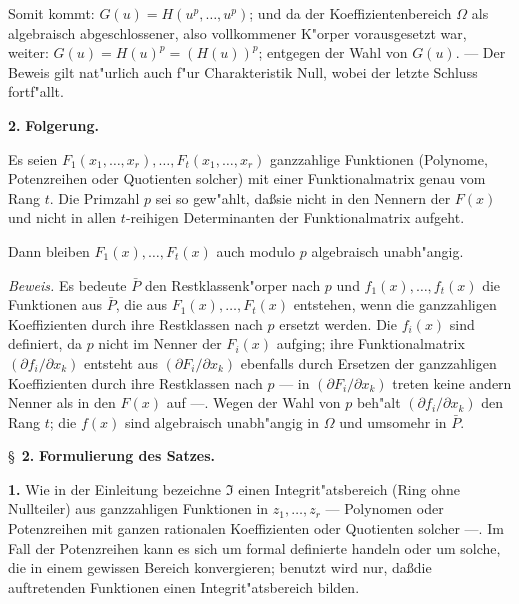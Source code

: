 \documentclass[12pt,a4paper]{article}
\theoremstyle{plain}
\begin{document}
Somit kommt: $G(u) = H(u^p,\ldots,u^p)$; und da der Koeffizientenbereich $\Omega$ als algebraisch abgeschlossener, also vollkommener K"orper vorausgesetzt war, weiter: $G(u) = H(u)^p = (H(u))^p$; entgegen der Wahl von $G(u)$. --- Der Beweis gilt nat"urlich auch f"ur Charakteristik Null, wobei der letzte Schluss fortf"allt.

\medskip\noindent\textbf{2.} \textbf{Folgerung.}

Es seien $F_1(x_1,\ldots,x_r),\ldots,F_t(x_1,\ldots,x_r)$ ganzzahlige Funktionen (Polynome, Potenzreihen oder Quotienten solcher) mit einer Funktionalmatrix genau vom Rang $t$. Die Primzahl $p$ sei so gew"ahlt, da\ss sie nicht in den Nennern der $F(x)$ und nicht in allen $t$-reihigen Determinanten der Funktionalmatrix aufgeht.

Dann bleiben $F_1(x),\ldots,F_t(x)$ auch modulo $p$ algebraisch unabh"angig.

\noindent\textit{Beweis.}
Es bedeute $\bar{P}$ den Restklassenk"orper nach $p$ und $f_1(x),\ldots,f_t(x)$ die Funktionen aus $\bar{P}$, die aus $F_1(x),\ldots,F_t(x)$ entstehen, wenn die ganzzahligen Koeffizienten durch ihre Restklassen nach $p$ ersetzt werden. Die $f_i(x)$ sind definiert, da $p$ nicht im Nenner der $F_i(x)$ aufging; ihre Funktionalmatrix $(\partial f_i/\partial x_k)$ entsteht aus $(\partial F_i/\partial x_k)$ ebenfalls durch Ersetzen der ganzzahligen Koeffizienten durch ihre Restklassen nach $p$ --- in $(\partial F_i/\partial x_k)$ treten keine andern Nenner als in den $F(x)$ auf ---. Wegen der Wahl von $p$ beh"alt $(\partial f_i/\partial x_k)$ den Rang $t$; die $f(x)$ sind algebraisch unabh"angig in $\Omega$ und umsomehr in $\bar{P}$.

\newpage
\S~\textbf{2.}
\textbf{Formulierung des Satzes.}

\smallskip

\noindent\textbf{1.}
Wie in der Einleitung bezeichne $\mathfrak{I}$ einen Integrit"atsbereich (Ring ohne Nullteiler) aus ganzzahligen Funktionen in $z_1,\ldots,z_r$ --- Polynomen oder Potenzreihen mit ganzen rationalen Koeffizienten oder Quotienten solcher ---. Im Fall der Potenzreihen kann es sich um formal definierte handeln oder um solche, die in einem gewissen Bereich konvergieren; benutzt wird nur, da\ss die auftretenden Funktionen einen Integrit"atsbereich bilden.
\end{document}
